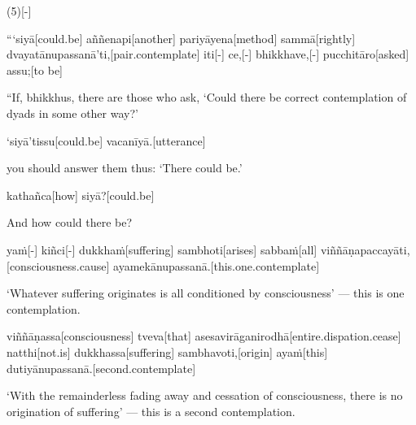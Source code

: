 \vskip 0.2in
\begin{samepage}
\begingl[glneveryline={\PaliGlossA,\PaliGlossB}]
(5)[-]
\endgl
\nopagebreak
\linespread{0.5}
\begin{spacin}{0.2}
{\PaliGlossFT [5. Consciousness]}
\end{spacin}
\vskip 12pt
\end{samepage}
\begin{samepage}
\begingl[glneveryline={\PaliGlossA,\PaliGlossB}]
“‘siyā[could.be] aññenapi[another] pariyāyena[method] sammā[rightly] dvayatānupassanā’ti,[pair.contemplate] iti[-] ce,[-] bhikkhave,[-] pucchitāro[asked] assu;[to be]
\endgl
\nopagebreak
\linespread{0.5}
\begin{spacin}{0.2}
{\PaliGlossFT “If, bhikkhus, there are those who ask, ‘Could there be correct contemplation of dyads in some other way?’}
\end{spacin}
\vskip 12pt
\end{samepage}
\begin{samepage}
\begingl[glneveryline={\PaliGlossA,\PaliGlossB}]
‘siyā’tissu[could.be] vacanīyā.[utterance]
\endgl
\nopagebreak
\linespread{0.5}
\begin{spacin}{0.2}
{\PaliGlossFT you should answer them thus: ‘There could be.’}
\end{spacin}
\vskip 12pt
\end{samepage}
\begin{samepage}
\begingl[glneveryline={\PaliGlossA,\PaliGlossB}]
kathañca[how] siyā?[could.be]
\endgl
\nopagebreak
\linespread{0.5}
\begin{spacin}{0.2}
{\PaliGlossFT And how could there be?}
\end{spacin}
\vskip 12pt
\end{samepage}
\begin{samepage}
\begingl[glneveryline={\PaliGlossA,\PaliGlossB}]
yaṁ[-] kiñci[-] dukkhaṁ[suffering] sambhoti[arises] sabbaṁ[all] viññāṇapaccayāti,[consciousness.cause] ayamekānupassanā.[this.one.contemplate]
\endgl
\nopagebreak
\linespread{0.5}
\begin{spacin}{0.2}
{\PaliGlossFT ‘Whatever suffering originates is all conditioned by consciousness’ — ­this is one contemplation.}
\end{spacin}
\vskip 12pt
\end{samepage}
\begin{samepage}
\begingl[glneveryline={\PaliGlossA,\PaliGlossB}]
viññāṇassa[consciousness] tveva[that] asesavirāganirodhā[entire.dispation.cease] natthi[not.is] dukkhassa[suffering] sambhavoti,[origin] ayaṁ[this] dutiyānupassanā.[second.contemplate]
\endgl
\nopagebreak
\linespread{0.5}
\begin{spacin}{0.2}
{\PaliGlossFT ‘With the remainderless fading away and cessation of consciousness, there is no origination of suffering’ — this is a second contemplation.}
\end{spacin}
\vskip 12pt
\end{samepage}
